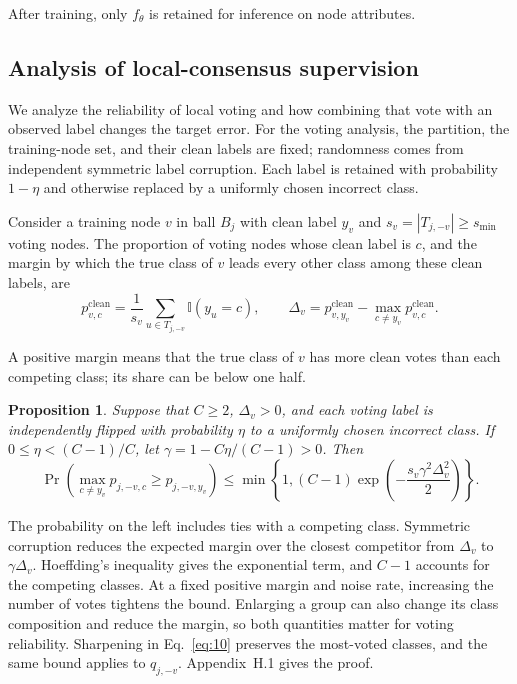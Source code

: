\documentclass[10pt,letterpaper,nopreprintline]{elsarticle}
\theoremstyle{plain}
\newtheorem{proposition}{Proposition}
\begin{document}
After training, only \(f_{\theta}\) is retained for inference on node attributes.

\subsection{Analysis of local-consensus supervision}\label{sec:3.4}

We analyze the reliability of local voting and how combining that vote with an observed label changes the target error. For the voting analysis, the partition, the training-node set, and their clean labels are fixed; randomness comes from independent symmetric label corruption. Each label is retained with probability \(1-\eta\) and otherwise replaced by a uniformly chosen incorrect class.

Consider a training node \(v\) in ball \(B_j\) with clean label \(y_v\) and \(s_v=|T_{j,-v}|\geq s_{\min}\) voting nodes. The proportion of voting nodes whose clean label is \(c\), and the margin by which the true class of \(v\) leads every other class among these clean labels, are
\begin{equation}\label{eq:14}
p^{\mathrm{clean}}_{v,c}=\frac{1}{s_v}\sum_{u\in T_{j,-v}}\mathbb{I}(y_u=c),
\qquad
\Delta_v=p^{\mathrm{clean}}_{v,y_v}-\max_{c\ne y_v}p^{\mathrm{clean}}_{v,c}.
\end{equation}

A positive margin means that the true class of \(v\) has more clean votes than each competing class; its share can be below one half.

\begin{proposition}\label{prop:local_vote}
Suppose that \(C\geq2\), \(\Delta_v>0\), and each voting label is independently flipped with probability \(\eta\) to a uniformly chosen incorrect class. If \(0\leq\eta<(C-1)/C\), let \(\gamma=1-C\eta/(C-1)>0\). Then
\begin{equation}\label{eq:15}
\Pr\!\left(\max_{c\ne y_v}p_{j,-v,c}\geq p_{j,-v,y_v}\right)
\leq \min\!\left\{1,(C-1)\exp\!\left(-\frac{s_v\gamma^2\Delta_v^2}{2}\right)\right\}.
\end{equation}
\end{proposition}

The probability on the left includes ties with a competing class. Symmetric corruption reduces the expected margin over the closest competitor from \(\Delta_v\) to \(\gamma\Delta_v\). Hoeffding's inequality gives the exponential term, and \(C-1\) accounts for the competing classes. At a fixed positive margin and noise rate, increasing the number of votes tightens the bound. Enlarging a group can also change its class composition and reduce the margin, so both quantities matter for voting reliability. Sharpening in Eq.~\eqref{eq:10} preserves the most-voted classes, and the same bound applies to \(q_{j,-v}\). Appendix~H.1 gives the proof.
\end{document}

